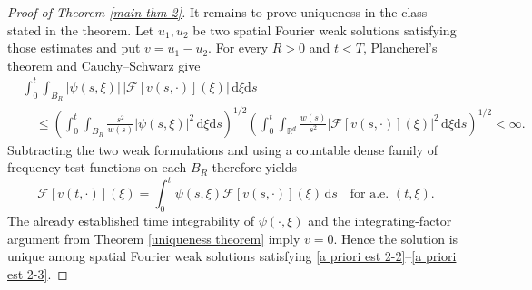\documentclass[11pt,reqno]{amsart}
\theoremstyle{definition}
\theoremstyle{remark}
\newcommand\bR{\mathbb{R}}
\newcommand\cF{\mathcal{F}}
\numberwithin{equation}{section}
\begin{document}
\begin{proof}[Proof of Theorem \ref{main thm 2}]
It remains to prove uniqueness in the class stated in the theorem.  Let
$u_1,u_2$ be two spatial Fourier weak solutions satisfying those estimates
and put $v=u_1-u_2$.  For every $R>0$ and $t<T$, Plancherel's theorem and
Cauchy--Schwarz give
\begin{align*}
&\int_0^t\int_{B_R}|\psi(s,\xi)|\,|\cF[v(s,\cdot)](\xi)|
\,\mathrm{d}\xi\mathrm{d}s\\
&\quad\leq
\left(\int_0^t\int_{B_R}\frac{s^2}{w(s)}|\psi(s,\xi)|^2
\,\mathrm{d}\xi\mathrm{d}s\right)^{1/2}
\left(\int_0^t\int_{\bR^d}\frac{w(s)}{s^2}
|\cF[v(s,\cdot)](\xi)|^2\,\mathrm{d}\xi\mathrm{d}s\right)^{1/2}<\infty.
\end{align*}
Subtracting the two weak formulations and using a countable dense family of
frequency test functions on each $B_R$ therefore yields
\[
\cF[v(t,\cdot)](\xi)
=\int_0^t\psi(s,\xi)\cF[v(s,\cdot)](\xi)\,\mathrm{d}s
\quad\text{for a.e. }(t,\xi).
\]
The already established time integrability of $\psi(\cdot,\xi)$ and the
integrating-factor argument from Theorem \ref{uniqueness theorem} imply
$v=0$.  Hence the solution is unique among spatial Fourier weak solutions
satisfying \eqref{a priori est 2-2}--\eqref{a priori est 2-3}.
\end{proof}
\end{document}
